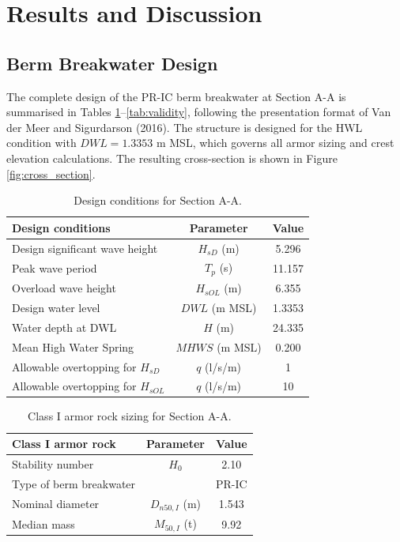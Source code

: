 \documentclass[a4paper, 11pt]{article}
\begin{document}
\section{Results and Discussion}
\subsection{Berm Breakwater Design}
\hspace{0.5cm}The complete design of the PR-IC berm breakwater at Section A-A is summarised in Tables \ref{tab:design_conditions}--\ref{tab:validity}, following the presentation format of Van der Meer and Sigurdarson (2016). The structure is designed for the HWL condition with $DWL = 1.3353$ m MSL, which governs all armor sizing and crest elevation calculations. The resulting cross-section is shown in Figure \ref{fig:cross_section}.

\begin{table}[H]
\centering
\caption{Design conditions for Section A-A.}
\label{tab:design_conditions}
\begin{tabular}{lcc}
\hline
Design conditions & Parameter & Value \\
\hline
Design significant wave height & $H_{sD}$ (m) & 5.296 \\
Peak wave period & $T_p$ (s) & 11.157 \\
Overload wave height & $H_{sOL}$ (m) & 6.355 \\
Design water level & $DWL$ (m MSL) & 1.3353 \\
Water depth at DWL & $H$ (m) & 24.335 \\
Mean High Water Spring & $MHWS$ (m MSL) & 0.200 \\
Allowable overtopping for $H_{sD}$ & $q$ (l/s/m) & 1 \\
Allowable overtopping for $H_{sOL}$ & $q$ (l/s/m) & 10 \\
\hline
\end{tabular}
\end{table}

\begin{table}[H]
\centering
\caption{Class I armor rock sizing for Section A-A.}
\label{tab:class_I}
\begin{tabular}{lcc}
\hline
Class I armor rock & Parameter & Value \\
\hline
Stability number & $H_0$ & 2.10 \\
Type of berm breakwater & & PR-IC \\
Nominal diameter & $D_{n50,I}$ (m) & 1.543 \\
Median mass & $M_{50,I}$ (t) & 9.92 \\
\hline
\end{tabular}
\end{table}
\end{document}
